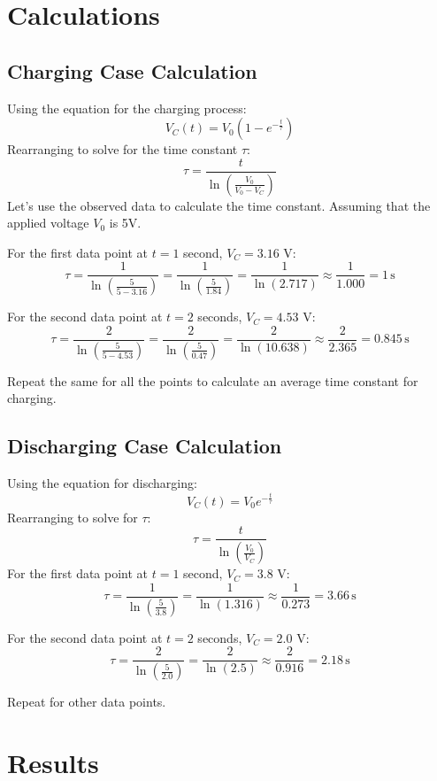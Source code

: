 \documentclass[a4paper,12pt]{article}
\begin{document}
\section*{\color{myblue}Calculations}

\subsection*{\color{mygreen}Charging Case Calculation}
Using the equation for the charging process:
\[
V_C(t) = V_0 \left( 1 - e^{-\frac{t}{\tau}} \right)
\]
Rearranging to solve for the time constant $\tau$:
\[
\tau = \frac{t}{\ln \left( \frac{V_0}{V_0 - V_C} \right)}
\]
Let's use the observed data to calculate the time constant. Assuming that the applied voltage $V_0$ is 5V.

For the first data point at \( t = 1 \) second, \( V_C = 3.16 \) V:
\[
\tau = \frac{1}{\ln \left( \frac{5}{5 - 3.16} \right)} = \frac{1}{\ln \left( \frac{5}{1.84} \right)} = \frac{1}{\ln(2.717)} \approx \frac{1}{1.000} = 1 \, \text{s}
\]

For the second data point at \( t = 2 \) seconds, \( V_C = 4.53 \) V:
\[
\tau = \frac{2}{\ln \left( \frac{5}{5 - 4.53} \right)} = \frac{2}{\ln \left( \frac{5}{0.47} \right)} = \frac{2}{\ln(10.638)} \approx \frac{2}{2.365} = 0.845 \, \text{s}
\]

Repeat the same for all the points to calculate an average time constant for charging.

\subsection*{\color{mygreen}Discharging Case Calculation}
Using the equation for discharging:
\[
V_C(t) = V_0 e^{-\frac{t}{\tau}}
\]
Rearranging to solve for $\tau$:
\[
\tau = \frac{t}{\ln \left( \frac{V_0}{V_C} \right)}
\]
For the first data point at \( t = 1 \) second, \( V_C = 3.8 \) V:
\[
\tau = \frac{1}{\ln \left( \frac{5}{3.8} \right)} = \frac{1}{\ln(1.316)} \approx \frac{1}{0.273} = 3.66 \, \text{s}
\]

For the second data point at \( t = 2 \) seconds, \( V_C = 2.0 \) V:
\[
\tau = \frac{2}{\ln \left( \frac{5}{2.0} \right)} = \frac{2}{\ln(2.5)} \approx \frac{2}{0.916} = 2.18 \, \text{s}
\]

Repeat for other data points.

\section*{\color{myblue}Results}
\end{document}
